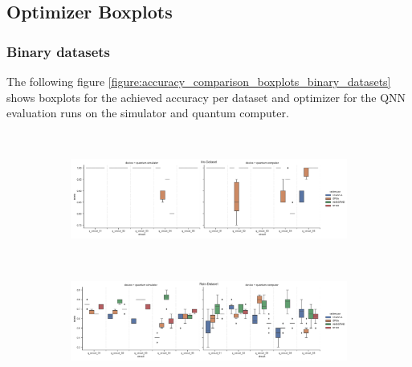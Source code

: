 \clearpage

\subsection{Optimizer Boxplots}
\label{subsubsection:optimizer_boxplots}

\subsubsection{Binary datasets}
\label{subsubsection:binary_datasets_boxplots}
The following figure \ref{figure:accuracy_comparison_boxplots_binary_datasets} shows boxplots for the achieved accuracy per dataset and optimizer for the QNN evaluation runs on the simulator and quantum computer.

\begin{figure}[!ht]
    \centering
    \\[-3ex]
    \begin{subfigure}{1.0\textwidth}
        \centering
        \includegraphics[width=1.0\linewidth]{thesis/Figures/qnn/boxplots/100_iris.png} 
        \label{subfigure:accuracy_comparison_boxplots_iris_binary_dataset}
    \end{subfigure}
    \\[-3ex]
    \begin{subfigure}{1.0\textwidth}
        \centering
        \includegraphics[width=1.0\linewidth]{thesis/Figures/qnn/boxplots/100_rain.png} 
        \label{subfigure:accuracy_comparison_boxplots_rain_binary_dataset}
    \end{subfigure}
    \\[-3ex]
    \begin{subfigure}{1.0\textwidth}

\end{subfigure}
\end{figure}
